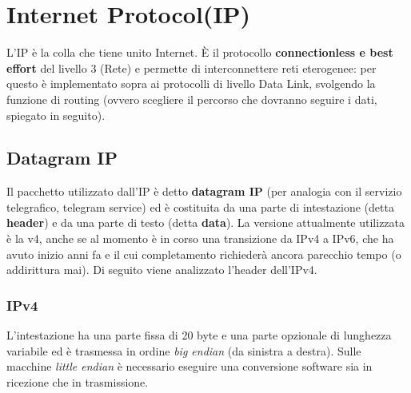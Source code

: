 \section{Internet Protocol(IP)}
    L’IP è la colla che tiene unito Internet. È il protocollo \textbf{connectionless e best effort} del livello 3
    (Rete) e permette di interconnettere reti eterogenee: per questo è implementato sopra ai
    protocolli di livello Data Link, svolgendo la funzione di routing (ovvero scegliere il percorso che
    dovranno seguire i dati, spiegato in seguito).
        
    \subsection{Datagram IP}
        Il pacchetto utilizzato dall’IP è detto \textbf{datagram IP} (per analogia con il servizio telegrafico,
        telegram service) ed è costituita da una parte di intestazione (detta \textbf{header}) e da una parte di
        testo (detta \textbf{data}). La versione attualmente utilizzata è la v4, anche se al momento è in corso
        una transizione da IPv4 a IPv6, che ha avuto inizio anni fa e il cui completamento richiederà
        ancora parecchio tempo (o addirittura mai). Di seguito viene analizzato l’header dell’IPv4.
    
        \subsubsection{IPv4}
            L’intestazione ha una parte fissa di 20 byte e una parte opzionale di lunghezza variabile ed è
            trasmessa in ordine \textit{big endian} (da sinistra a destra). Sulle macchine \textit{little endian} è necessario
            eseguire una conversione software sia in ricezione che in trasmissione.\\
           
            
